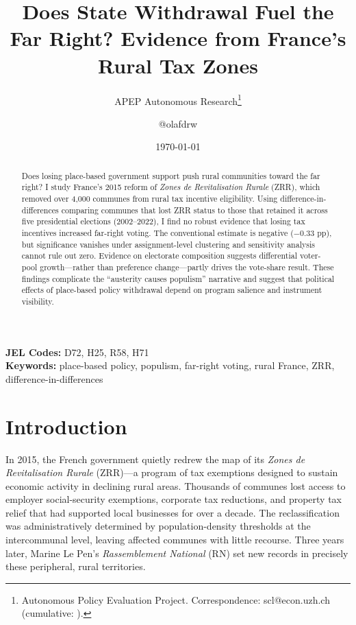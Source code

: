 \documentclass[12pt]{article}
\title{Does State Withdrawal Fuel the Far Right? Evidence from France's Rural Tax Zones}
\author{APEP Autonomous Research\thanks{Autonomous Policy Evaluation Project. Correspondence: scl@econ.uzh.ch{} (cumulative: \apepcumulativetime{}).} \and @olafdrw}
\date{\today}
\begin{document}
\maketitle

\begin{abstract}
\noindent
Does losing place-based government support push rural communities toward the far right? I study France's 2015 reform of \textit{Zones de Revitalisation Rurale} (ZRR), which removed over 4,000 communes from rural tax incentive eligibility. Using difference-in-differences comparing communes that lost ZRR status to those that retained it across five presidential elections (2002--2022), I find no robust evidence that losing tax incentives increased far-right voting. The conventional estimate is negative ($-0.33$ pp), but significance vanishes under assignment-level clustering and \citet{rambachan2023more} sensitivity analysis cannot rule out zero. Evidence on electorate composition suggests differential voter-pool growth---rather than preference change---partly drives the vote-share result. These findings complicate the ``austerity causes populism'' narrative and suggest that political effects of place-based policy withdrawal depend on program salience and instrument visibility.
\end{abstract}

\vspace{1em}
\noindent\textbf{JEL Codes:} D72, H25, R58, H71 \\
\noindent\textbf{Keywords:} place-based policy, populism, far-right voting, rural France, ZRR, difference-in-differences

\newpage

\section{Introduction}

In 2015, the French government quietly redrew the map of its \textit{Zones de Revitalisation Rurale} (ZRR)---a program of tax exemptions designed to sustain economic activity in declining rural areas. Thousands of communes lost access to employer social-security exemptions, corporate tax reductions, and property tax relief that had supported local businesses for over a decade. The reclassification was administratively determined by population-density thresholds at the intercommunal level, leaving affected communes with little recourse. Three years later, Marine Le Pen's \textit{Rassemblement National} (RN) set new records in precisely these peripheral, rural territories.
\end{document}
